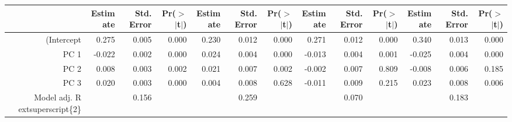 \begin{table}[ht]
\centering
\begin{tabular}{rrrrrrrrrrrrr}
  \hline
 & Estimate & Std. Error & Pr($>$$|$t$|$) & Estimate & Std. Error & Pr($>$$|$t$|$) & Estimate & Std. Error & Pr($>$$|$t$|$) & Estimate & Std. Error & Pr($>$$|$t$|$) \\ 
  \hline
(Intercept & 0.275 & 0.005 & 0.000 & 0.230 & 0.012 & 0.000 & 0.271 & 0.012 & 0.000 & 0.340 & 0.013 & 0.000 \\ 
  PC 1 & -0.022 & 0.002 & 0.000 & 0.024 & 0.004 & 0.000 & -0.013 & 0.004 & 0.001 & -0.025 & 0.004 & 0.000 \\ 
  PC 2 & 0.008 & 0.003 & 0.002 & 0.021 & 0.007 & 0.002 & -0.002 & 0.007 & 0.809 & -0.008 & 0.006 & 0.185 \\ 
  PC 3 & 0.020 & 0.003 & 0.000 & 0.004 & 0.008 & 0.628 & -0.011 & 0.009 & 0.215 & 0.023 & 0.008 & 0.006 \\ 
  Model adj. R	extsuperscript\{2\} &  & 0.156 &  &  & 0.259 &  &  & 0.070 &  &  & 0.183 &  \\ 
   \hline
\end{tabular}
\end{table}
